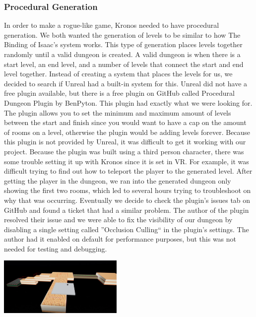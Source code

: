 \documentclass{sigchi}
\begin{document}
\subsubsection*{Procedural Generation}
In order to make a rogue-like game, Kronos needed to have procedural generation. We both wanted the generation of levels to be similar to how The Binding of Isaac's system works. This type of generation places levels together randomly until a valid dungeon is created. A valid dungeon is when there is a start level, an end level, and a number of levels that connect the start and end level together. Instead of creating a system that places the levels for us, we decided to search if Unreal had a built-in system for this. Unreal did not have a free plugin available, but there is a free plugin on GitHub called Procedural Dungeon Plugin by BenPyton. This plugin had exactly what we were looking for. The plugin allows you to set the minimum and maximum amount of levels between the start and finish since you would want to have a cap on the amount of rooms on a level, otherwise the plugin would be adding levels forever. Because this plugin is not provided by Unreal, it was difficult to get it working with our project. Because the plugin was built using a third person character, there was some trouble setting it up with Kronos since it is set in VR. For example, it was difficult trying to find out how to teleport the player to the generated level. After getting the player in the dungeon, we ran into the generated dungeon only showing the first two rooms, which led to several hours trying to troubleshoot on why that was occurring. Eventually we decide to check the plugin's issues tab on GitHub and found a ticket that had a similar problem. The author of the plugin resolved their issue and we were able to fix the visibility of our dungeon by disabling a single setting called ''Occlusion Culling`` in the plugin's settings. The author had it enabled on default for performance purposes, but this was not needed for testing and debugging.
\begin{center}
    \includegraphics[width=0.45\textwidth]{dungeon.png}
    \label{fig:Sprites}
\end{center}
\end{document}
